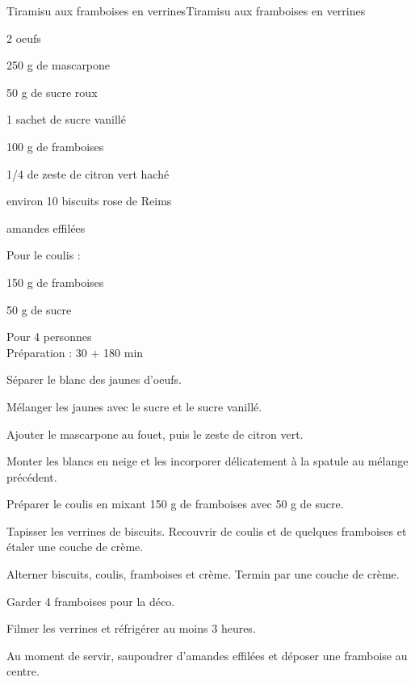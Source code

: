 \begin{recette}{Tiramisu aux framboises en verrines}{Tiramisu aux framboises en verrines}

\begin{ingredients}
2 oeufs\par
250 g de mascarpone\par
50 g de sucre roux\par
1 sachet de sucre vanillé\par
100 g de framboises\par
1/4 de zeste de citron vert haché\par
environ 10 biscuits rose de Reims\par
amandes effilées\par
Pour le coulis :\par
150 g de framboises\par
50 g de sucre\par
\end{ingredients}

\begin{infos}
Pour 4 personnes\\
Préparation : 30 + 180 min\\
\end{infos}

\begin{etapes}
\item Séparer le blanc des jaunes d’oeufs.
\item Mélanger les jaunes avec le sucre et le sucre vanillé.
\item Ajouter le mascarpone au fouet, puis le zeste de citron vert.
\item Monter les blancs en neige et les incorporer délicatement à la spatule au mélange précédent.
\item Préparer le coulis en mixant 150 g de framboises avec 50 g de sucre.
\item Tapisser les verrines de biscuits. Recouvrir de coulis et de quelques framboises et étaler une couche de crème.
\item Alterner biscuits, coulis, framboises et crème. Termin par une couche de crème.
\item Garder 4 framboises pour la déco.
\item Filmer les verrines et réfrigérer au moins 3 heures.
\item Au moment de servir, saupoudrer d’amandes effilées et déposer une framboise au centre.
\end{etapes}

\end{recette}